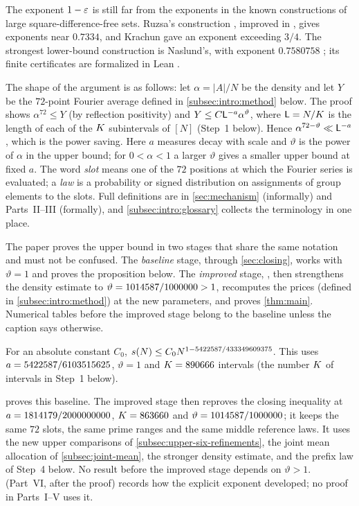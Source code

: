 The exponent $1-\varepsilon$ is still far from the exponents in the known
constructions of large square-difference-free sets. Ruzsa's construction
\cite{Ruzsa84}, improved in \cite{BeigelGasarch,Lewko15}, gives
exponents near $0.7334$, and Krachun \cite{Krachun} gave an
exponent exceeding $3/4$. The strongest lower-bound construction
is Naslund's, with exponent $0.7580758$
\cite{NaslundHexagon2026}; its finite certificates are formalized
in Lean \cite{NaslundPalomar2026}.

The shape of the argument is as follows: let $\alpha=|A|/N$ be the density and let $Y$ be the
$72$-point Fourier average defined in \cref{subsec:intro:method}
below. The proof shows $\alpha^{72}\le Y$ (by reflection positivity)
and $Y\le C\mathsf L^{-a}\alpha^{\vartheta}$, where $\mathsf L=N/K$ is the length of each of the
$K$ subintervals of $[N]$ (Step~1 below). Hence
$\alpha^{72-\vartheta}\ll\mathsf L^{-a}$, which is the power saving. Here
$a$ measures decay with scale and $\vartheta$ is the power of
$\alpha$ in the upper bound; for $0<\alpha<1$ a larger $\vartheta$
gives a smaller upper bound at fixed $a$. The word \emph{slot} means
one of the $72$ positions at which the Fourier series is evaluated;
a \emph{law} is a probability or signed distribution on assignments
of group elements to the slots. Full definitions are in
\cref{sec:mechanism} (informally) and Parts~II--III (formally), and
\cref{subsec:intro:glossary} collects the terminology in one place.

The paper proves the upper bound in two stages that share the same
notation and must not be confused. The \emph{baseline} stage, through
\cref{sec:closing}, works with $\vartheta=1$ and proves the
proposition below. The \emph{improved} stage,
, then
strengthens the density estimate to
$\vartheta=1014587/1000000>1$, recomputes the prices (defined
in \cref{subsec:intro:method}) at the new parameters, and proves
\cref{thm:main}. Numerical tables before the
improved stage belong to the baseline unless the caption says
otherwise.
\begin{proposition}[The baseline bound, with density exponent $\vartheta=1$]\label{thm:baseline}
For an absolute constant $C_0$,
$s(N)\le C_0N^{1-5422587/433349609375}$. This uses $a=5422587/6103515625$,
$\vartheta=1$ and $K=890666$ intervals (the number $K$ of
intervals in Step~1 below).
\end{proposition}
 proves this baseline. The improved stage
then reproves the closing inequality at
$a=1814179/2000000000$, $K=863660$ and
$\vartheta=1014587/1000000$; it keeps the same $72$ slots, the same
prime ranges and the same middle reference laws. It uses the new upper
comparisons of \cref{subsec:upper-six-refinements}, the joint mean
allocation of \cref{subsec:joint-mean}, the stronger density estimate,
and the prefix law of Step~4 below. No result
before the improved stage depends on $\vartheta>1$.
 (Part~VI, after the proof) records how the
explicit exponent developed; no proof in Parts~I--V uses it.

